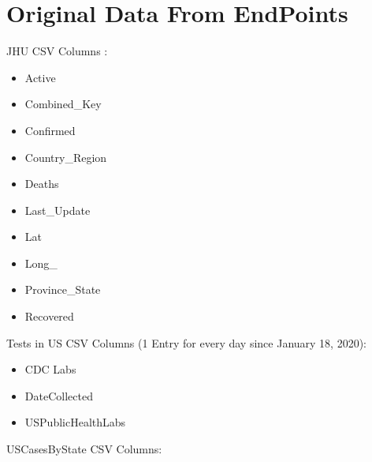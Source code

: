 \documentclass[11pt]{article}
\newcommand{\comment}[1]{{\color{red}{#1}}}
\begin{document}
\appendix

\section{Original Data From EndPoints}

\noindent
JHU CSV Columns :

\begin{itemize}
    \item Active
    \item Combined\_Key
    \item Confirmed
    \item Country\_Region
    \item Deaths
    \item Last\_Update
    \item Lat
    \item Long\_
    \item Province\_State
    \item Recovered
\end{itemize}

\noindent
Tests in US CSV Columns (1 Entry for every day since January 18, 2020):

\begin{itemize}
    \item CDC Labs
    \item DateCollected
    \item USPublicHealthLabs
\end{itemize}

\noindent
USCasesByState CSV Columns:
\end{document}
